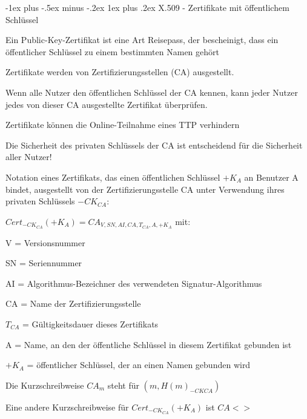 \documentclass[a4paper]{article}
\makeatletter
\renewcommand{\subsubsection}{\@startsection{subsubsection}{3}{0mm}%
 {-1ex plus -.5ex minus -.2ex}%
 {1ex plus .2ex}%
 {\normalfont\small\bfseries}}
\makeatother
\begin{document}
\begin{multicols}{3}
      \subsubsection{X.509 - Zertifikate mit öffentlichem Schlüssel}
      \begin{itemize*}
            \item Ein Public-Key-Zertifikat ist eine Art Reisepass, der bescheinigt, dass ein öffentlicher Schlüssel zu einem bestimmten Namen gehört
            \item Zertifikate werden von Zertifizierungsstellen (CA) ausgestellt.
            \item Wenn alle Nutzer den öffentlichen Schlüssel der CA kennen, kann jeder Nutzer jedes von dieser CA ausgestellte Zertifikat überprüfen.
            \item Zertifikate können die Online-Teilnahme eines TTP verhindern
            \item Die Sicherheit des privaten Schlüssels der CA ist entscheidend für die Sicherheit aller Nutzer!
            \item Notation eines Zertifikats, das einen öffentlichen Schlüssel $+K_A$ an Benutzer A bindet, ausgestellt von der Zertifizierungsstelle CA unter Verwendung ihres privaten Schlüssels $-CK_{CA}$:
            \begin{itemize*}
                  \item $Cert_{-CK_{CA}}(+K_A) = CA_{V, SN, AI, CA, T_{CA}, A, +K_A}$ mit:
                  \begin{itemize*}
                        \item V = Versionsnummer
                        \item SN = Seriennummer
                        \item AI = Algorithmus-Bezeichner des verwendeten Signatur-Algorithmus
                        \item CA = Name der Zertifizierungsstelle
                        \item $T_{CA}$ = Gültigkeitsdauer dieses Zertifikats
                        \item A = Name, an den der öffentliche Schlüssel in diesem Zertifikat gebunden ist
                        \item $+K_A$ = öffentlicher Schlüssel, der an einen Namen gebunden wird
                  \end{itemize*}
                  \item Die Kurzschreibweise $CA_m$ steht für $(m,{H(m)}_{{-CK}{CA}})$
                  \item Eine andere Kurzschreibweise für $Cert_{-CK_{CA}}(+K_A)$ ist $CA<>$
            \end{itemize*}
      \end{itemize*}


\end{multicols}
\end{document}
